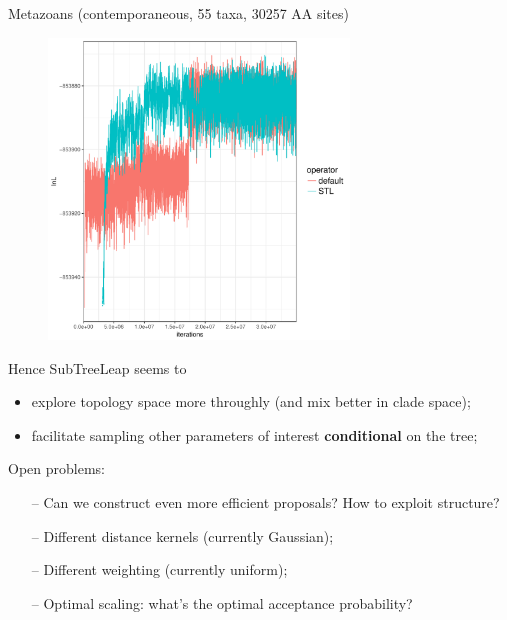 \documentclass[newPxFont,numfooter,sectionpages]{beamer}
\begin{document}
\begin{frame}{Metazoans (contemporaneous, 55 taxa, 30257 AA sites)}
\begin{figure}
	\includegraphics[width=\textwidth,height=8cm]{figures/comparison_metazoan.pdf} 
\end{figure}
\end{frame}

\begin{frame}{Hence}
SubTreeLeap seems to
\begin{itemize}
 \item explore topology space more throughly (and mix better in clade space);
 \item facilitate sampling other parameters of interest \textbf{conditional} on the tree;
\end{itemize}

Open problems:
\begin{itemize}
 \item[--] Can we construct even more efficient proposals? How to exploit structure?
 \item[--] Different distance kernels (currently Gaussian);
 \item[--] Different weighting (currently uniform);
 \item[--] Optimal scaling: what's the optimal acceptance probability?
\end{itemize}
\end{frame}
\end{document}
